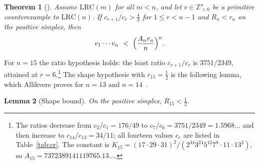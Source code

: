 \documentclass[aps,prd,twocolumn,superscriptaddress,nofootinbib,longbibliography,floatfix,showkeys,amsmath,amssymb,10pt]{revtex4-2}
\newtheorem{theorem}{Theorem}
\newtheorem{lemma}[theorem]{Lemma}
\theoremstyle{definition}
\theoremstyle{remark}
\newcommand{\Z}{\mathbb{Z}}
\newcommand{\LRC}{\mathrm{LRC}}
\begin{document}
\begin{theorem}[{\cite[Theorem~3.8]{All26}}]\label{thm:flag}
Assume $\LRC(m)$ for all $m<n$, and let $v\in\Z_{>0}^n$ be a primitive
counterexample to $\LRC(n)$. If $c_{r+1}/c_r>\frac43$ for $1\le r<n-1$ and
$R_n<r_n$ on the positive simplex, then
\[
 v_1\cdots v_n\ <\ \Bigl(\frac{A_nr_n}n\Bigr)^n .
\]
\end{theorem}

For $n=15$ the ratio hypothesis holds: the least ratio $c_{r+1}/c_r$ is
$3751/2349$, attained at $r=6$.\footnote{The ratios decrease from
$c_2/c_1=176/49$ to $c_7/c_6=3751/2349=1.5968\ldots$ and then increase to
$c_{14}/c_{13}=34/11$; all fourteen values $c_r$ are listed in
Table~\ref{tab:cr}. The constant is
$K_{15}=(17\cdot29\cdot31)^2/(2^{34}3^{24}5^{12}7^8\cdot11\cdot13^2)$, so
$A_{15}=7372389141119765.13\ldots$.} The shape hypothesis with
$r_{15}=\frac12$ is the following lemma, which Allikvere proves for $n=13$
and $n=14$~\cite[Lemma~3.7]{All26}.

\begin{lemma}[Shape bound]\label{lem:shape}
On the positive simplex, $R_{15}<\frac12$.
\end{lemma}
\end{document}

